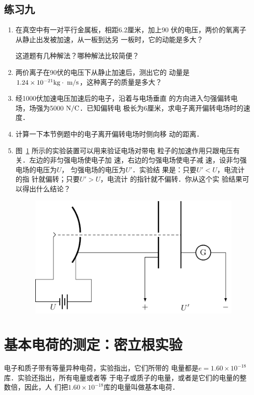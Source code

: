 \subsection*{练习九}
\begin{enumerate}
    \item 在真空中有一对平行金属板，相距6.2厘米，加上90
伏的电压，两价的氧离子从静止出发被加速，从一板到达另
一板时，它的动能是多大？

这道题有几种解法？哪种解法比较简便？

\item 两价离子在90伏的电压下从静止加速后，测出它的
动量是$1.24\times10^{-21}{\rm kg}\cdot \;\text{m}/\text{s}$，这种离子的质量是多大？

\item 经1000伏加速电压加速后的电子，沿着与电场垂直
的方向进入匀强偏转电场，场强为5000$\;\text{N}/\text{C}$．已知偏转电
极长为6厘米，求电子离开偏转电场时的速度．
\item 计算一下本节例题中的电子离开偏转电场时侧向移
动的距离．
\item 图~\ref{fig_B_6-30} 所示的实验装置可以用来验证电场对带电
粒子的加速作用只跟电压有关．左边的非匀强电场使电子加
速，右边的匀强电场使电子减
速，设非匀强电场的电压为$U$，
匀强电场的电压为$U'$．实验结
果是：只要$U'<U$，电流计的指
针就偏转；只要$U'>U$，电流计
的指针就不偏转．你从这个实
验结果可以得出什么结论？
\begin{figure}[htbp]
    \centering
    \includegraphics{fig/B/6-30.pdf}
    \caption{}\label{fig_B_6-30}
\end{figure}
\end{enumerate}

\section{基本电荷的测定：密立根实验}

电子和质子带有等量异种电荷，实验指出，它们所带的
电量都是$e=1.60\times10^{-18}$库．实验还指出，所有电量或者等
于电子或质子的电量，或者是它们的电量的整数倍，因此，人
们把$1.60\times10^{-18}$库的电量叫做基本电荷．

